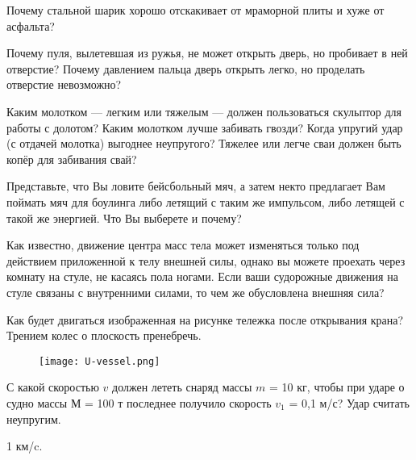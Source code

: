 \qualProblems

\begin{ex}
Почему стальной шарик хорошо отскакивает от мраморной плиты и хуже от асфальта?
\end{ex}

\begin{ex}
Почему пуля, вылетевшая из ружья, не может открыть дверь, но пробивает в ней отверстие? Почему давлением пальца  дверь открыть легко, но проделать отверстие невозможно?
\end{ex}

\begin{ex}
Каким молотком — легким или тяжелым — должен пользоваться скульптор для работы с долотом? Каким молотком лучше забивать гвозди? Когда упругий удар (с отдачей молотка) выгоднее неупругого? Тяжелее или легче сваи должен быть копёр для забивания свай?
\end{ex}

\begin{ex}
Представьте, что Вы ловите бейсбольный мяч, а затем некто предлагает Вам поймать мяч для боулинга либо летящий с таким же импульсом, либо летящей с такой же энергией. Что Вы выберете и почему?
\end{ex}

\begin{ex}
Как известно, движение центра масс тела может изменяться только под действием приложенной к телу внешней силы, однако вы можете проехать через комнату на стуле, не касаясь пола ногами. Если ваши судорожные движения на стуле связаны с внутренними силами, то чем же обусловлена внешняя сила?
\end{ex}

\begin{ex}
Как будет двигаться изображенная на рисунке тележка после открывания крана? Трением колес о плоскость пренебречь.

\begin{figure}[h]
\centering
\texttt{[image: U-vessel.png]}
\caption{}
\label{U-vessel}
\end{figure}
\end{ex}

\simpleProblems

\begin{ex} %
С какой скоростью $v$ должен лететь снаряд массы $m$ = 10 кг, чтобы при ударе о судно массы $М$ = 100 т последнее получило скорость $v_1$ = 0,1 м/с? Удар считать неупругим.
\begin{ans}
1 км/c.
\end{ans}
\end{ex}


